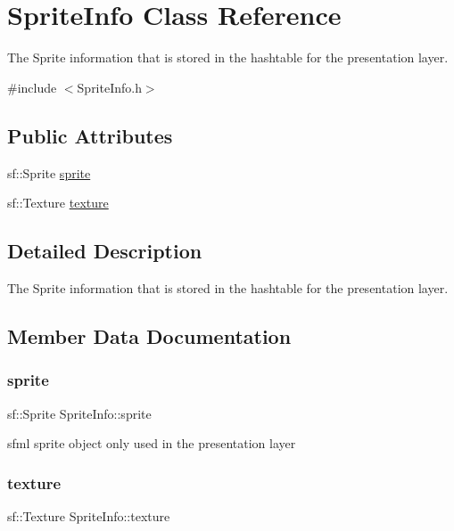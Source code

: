 \hypertarget{struct_sprite_info}{}\section{Sprite\+Info Class Reference}
\label{struct_sprite_info}


The Sprite information that is stored in the hashtable for the presentation layer.  




{\ttfamily \#include $<$Sprite\+Info.\+h$>$}

\subsection*{Public Attributes}
\begin{DoxyCompactItemize}
\item 
sf\+::\+Sprite \hyperlink{struct_sprite_info_a36b27e6a8518b83e62fe2cd48593d7ff}{sprite}
\item 
sf\+::\+Texture \hyperlink{struct_sprite_info_a589dffc2339ad7252950faea88128bab}{texture}
\end{DoxyCompactItemize}


\subsection{Detailed Description}
The Sprite information that is stored in the hashtable for the presentation layer. 

\subsection{Member Data Documentation}
\mbox{\label{struct_sprite_info_a36b27e6a8518b83e62fe2cd48593d7ff}} 
\subsubsection{\texorpdfstring{sprite}{sprite}}
{\footnotesize\ttfamily sf\+::\+Sprite Sprite\+Info\+::sprite}

sfml sprite object only used in the presentation layer \mbox{\label{struct_sprite_info_a589dffc2339ad7252950faea88128bab}} 
\subsubsection{\texorpdfstring{texture}{texture}}
{\footnotesize\ttfamily sf\+::\+Texture Sprite\+Info\+::texture}


